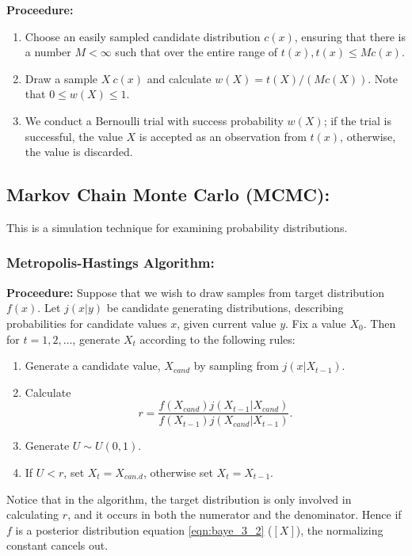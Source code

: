\documentclass[12pt,oneside,a4paper]{book}
\theoremstyle{definition}
\theoremstyle{remark}
\begin{document}
					\textbf{Proceedure:}
					\begin{enumerate}
						\item[i.] Choose an easily sampled candidate distribution $c(x)$, ensuring that there is a number $M < \infty$ such that over the entire range of $t(x), t(x) \le Mc(x)$.
						\item[ii.] Draw a sample $X ~ c(x)$ and calculate $w(X) = t(X)/(Mc(X))$. Note that $0 \le w(X) \le 1$.
						\item[iii.] We conduct a Bernoulli trial with success probability $w(X)$; if the trial is successful, the value
						$X$ is accepted as an observation from $t(x)$, otherwise, the value is discarded.
					\end{enumerate}

			\subsection{Markov Chain Monte Carlo (MCMC):}
				This is a simulation technique for examining probability distributions.

				\subsubsection{Metropolis-Hastings Algorithm:}
					\textbf{Proceedure:}
					Suppose that we wish to draw samples from target distribution $f(x)$.  Let $j(x|y)$ be candidate generating distributions, describing probabilities for candidate values $x$, given current value $y$.
					Fix a value $X_0$. Then for $t=1,2,\dots$, generate $X_t$ according to the following rules:
					\begin{enumerate}
						\item Generate a candidate value, $X_{cand}$ by sampling from $j(x|X_{t-1}).$
						\item Calculate $$r =\frac{f(X_{cand})j(X_{t-1}|X_{cand})}{f(X_{t-1})j(X_{cand}|X_{t-1})}.$$
						\item Generate $U \sim U(0,1).$
						\item If $U<r$, set $X_t = X_{can.d}$, otherwise set $X_t = X_{t-1}.$
					\end{enumerate}

					Notice that in the algorithm, the target distribution is only involved in calculating $r$, and it occurs in both the numerator and the denominator. Hence if $f$ is a posterior distribution equation \eqref{eqn:baye_3_2} ($[X]$), the normalizing constant cancels out.
\end{document}
